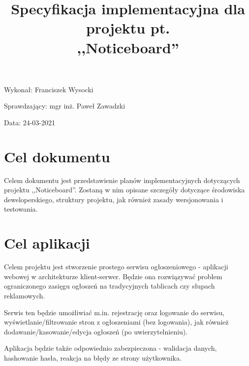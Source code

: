\documentclass{article}
\title{Specyfikacja implementacyjna dla projektu pt. \\ ,,Noticeboard''}
\author{}
\date{}
\begin{document}
\maketitle

\begin{flushright}
\par
\vfill
\par
{\fontsize{11}{11}\selectfont
    Wykonał: Franciszek Wysocki

    Sprawdzający: mgr inż. Paweł Zawadzki

    Data: 24-03-2021
}
\end{flushright}
\thispagestyle{empty}

\newpage

\tableofcontents

\newpage


\section{Cel dokumentu}
{\fontsize{12}{12}\selectfont
    Celem dokumentu jest przedstawienie planów implementacyjnych dotyczących projektu ,,Noticeboard''. Zostaną w nim opisane szczegóły dotyczące środowiska deweloperskiego, struktury projektu, jak również zasady wersjonowania i testowania.
}

\section{Cel aplikacji}
{\fontsize{12}{12}\selectfont
    Celem projektu jest stworzenie prostego serwisu ogłoszeniowego - aplikacji webowej w architekturze klient-serwer. Będzie ona rozwiązywać problem ograniczonego zasięgu ogłoszeń na tradycyjnych tablicach czy słupach reklamowych.
    
    Serwis ten będzie umożliwiać m.in. rejestrację oraz logowanie do serwisu, wyświetlanie/filtrowanie stron z ogłoszeniami (bez logowania), jak również dodawanie/kasowanie/edycja ogłoszeń (po uwierzytelnieniu). 
    
    Aplikacja będzie także odpowiednio zabezpieczona - walidacja danych, hashowanie hasła, reakcja na błędy ze strony użytkownika.
}
\end{document}
